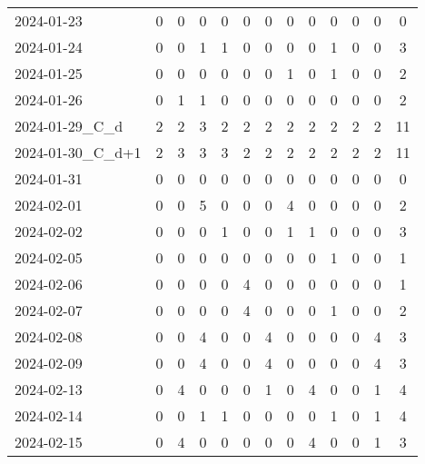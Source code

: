 \documentclass[dvipdfmx,oneside]{article}
\begin{document}
\begin{longtable}{lcccccccccccc}
        2024-01-23 &     0 &     0 &     0 &     0 &     0 &     0 &     0 &     0 &     0 &     0 &     0 &      0 \\
        2024-01-24 &     0 &     0 &     1 &     1 &     0 &     0 &     0 &     0 &     1 &     0 &     0 &      3 \\
        2024-01-25 &     0 &     0 &     0 &     0 &     0 &     0 &     1 &     0 &     1 &     0 &     0 &      2 \\
        2024-01-26 &     0 &     1 &     1 &     0 &     0 &     0 &     0 &     0 &     0 &     0 &     0 &      2 \\
  2024-01-29\_C\_d &     2 &     2 &     3 &     2 &     2 &     2 &     2 &     2 &     2 &     2 &     2 &     11 \\
2024-01-30\_C\_d+1 &     2 &     3 &     3 &     3 &     2 &     2 &     2 &     2 &     2 &     2 &     2 &     11 \\
        2024-01-31 &     0 &     0 &     0 &     0 &     0 &     0 &     0 &     0 &     0 &     0 &     0 &      0 \\
        2024-02-01 &     0 &     0 &     5 &     0 &     0 &     0 &     4 &     0 &     0 &     0 &     0 &      2 \\
        2024-02-02 &     0 &     0 &     0 &     1 &     0 &     0 &     1 &     1 &     0 &     0 &     0 &      3 \\
        2024-02-05 &     0 &     0 &     0 &     0 &     0 &     0 &     0 &     0 &     1 &     0 &     0 &      1 \\
        2024-02-06 &     0 &     0 &     0 &     0 &     4 &     0 &     0 &     0 &     0 &     0 &     0 &      1 \\
        2024-02-07 &     0 &     0 &     0 &     0 &     4 &     0 &     0 &     0 &     1 &     0 &     0 &      2 \\
        2024-02-08 &     0 &     0 &     4 &     0 &     0 &     4 &     0 &     0 &     0 &     0 &     4 &      3 \\
        2024-02-09 &     0 &     0 &     4 &     0 &     0 &     4 &     0 &     0 &     0 &     0 &     4 &      3 \\
        2024-02-13 &     0 &     4 &     0 &     0 &     0 &     1 &     0 &     4 &     0 &     0 &     1 &      4 \\
        2024-02-14 &     0 &     0 &     1 &     1 &     0 &     0 &     0 &     0 &     1 &     0 &     1 &      4 \\
        2024-02-15 &     0 &     4 &     0 &     0 &     0 &     0 &     0 &     4 &     0 &     0 &     1 &      3 \\

\end{longtable}
\end{document}
